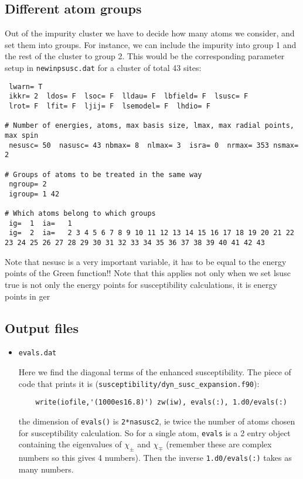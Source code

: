 \documentclass[11pt,fleqn]{book} %
\begin{document}
\subsection*{Different atom groups}
Out of the impurity cluster we have to decide how many atoms we consider, and set them into groups.
For instance, we can include the impurity into group 1 and the rest of the cluster to group 2.
This would be the corresponding parameter setup in \verb|newinpsusc.dat|
for a cluster of total 43 sites:
\begin{VBox}
{\small{
\begin{verbatim}
 lwarn= T
 ikkr= 2  ldos= F  lsoc= F  lldau= F  lbfield= F  lsusc= F
 lrot= F  lfit= F  ljij= F  lsemodel= F  lhdio= F

# Number of energies, atoms, max basis size, lmax, max radial points, max spin
 nesusc= 50  nasusc= 43 nbmax= 8  nlmax= 3  isra= 0  nrmax= 353 nsmax= 2

# Groups of atoms to be treated in the same way
 ngroup= 2
 igroup= 1 42

# Which atoms belong to which groups
 ig=  1  ia=   1
 ig=  2  ia=   2 3 4 5 6 7 8 9 10 11 12 13 14 15 16 17 18 19 20 21 22 23 24 25 26 27 28 29 30 31 32 33 34 35 36 37 38 39 40 41 42 43
\end{verbatim}
}}
\end{VBox}
Note that nesusc is a very important variable, it
has to be equal to the energy points of the Green function!!
Note that this applies not only when we set lsusc true
is not only the energy points for
susceptibility calculations, it is energy points in ger

\subsection{Output files}
\begin{itemize}

\item \verb|evals.dat|

Here we find the diagonal terms of the enhanced susceptibility. The piece of code that prints it
is (\verb|susceptibility/dyn_susc_expansion.f90|):
\begin{VBox}
\begin{verbatim}
    write(iofile,'(1000es16.8)') zw(iw), evals(:), 1.d0/evals(:)
\end{verbatim}
\end{VBox}
the dimension of \verb|evals()| is \verb|2*nasusc2|, ie twice the number of atoms chosen for
susceptibility calculation. So for a single atom,  \verb|evals| is a 2 entry object containing
the eigenvalues of $\chi_{\pm}$ and $\chi_{\mp}$ (remember these are complex numbers so
this gives 4 numbers). Then the inverse \verb|1.d0/evals(:)| takes as many numbers.

\end{itemize}
\end{document}
